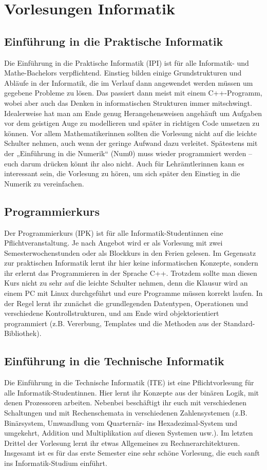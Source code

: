 \section{Vorlesungen Informatik}

\subsection{Einführung in die Praktische Informatik}
\label{info1}
Die Einführung in die Praktische Informatik (\gls{IPI}) ist für alle Informatik- und Mathe-Bachelors verpflichtend. Einstieg bilden einige Grundstrukturen und Abläufe in der Informatik, die im Verlauf dann angewendet werden müssen um gegebene Probleme zu lösen. Das passiert dann meist mit einem C++-Programm, wobei aber auch das Denken in informatischen Strukturen immer mitschwingt. Idealerweise hat man am Ende genug Herangehensweisen angehäuft um Aufgaben vor dem geistigen Auge zu modellieren und später in richtigen Code umsetzen zu können. Vor allem Mathematikerinnen sollten die Vorlesung nicht auf die leichte Schulter nehmen, auch wenn der geringe Aufwand dazu verleitet. Spätestens mit der „Einführung in die Numerik“ (\gls{Num0}) muss wieder programmiert werden -- euch darum drücken könnt ihr also nicht. Auch für Lehrämtlerinnen kann es interessant sein, die Vorlesung zu hören, um sich später den Einstieg in die Numerik zu vereinfachen.

\subsection{Programmierkurs}
\label{ipk}
Der Programmierkurs (\gls{IPK}) ist für alle Informatik-Studentinnen eine Pflichtveranstaltung. Je nach Angebot wird er als Vorlesung mit zwei Semesterwochenstunden oder als Blockkurs in den Ferien gelesen. Im Gegensatz zur praktischen Informatik lernt ihr hier keine informatischen Konzepte, sondern ihr erlernt das Programmieren in der Sprache C++. Trotzdem sollte man diesen Kurs nicht zu sehr auf die leichte Schulter nehmen, denn die Klausur wird an einem PC mit Linux durchgeführt und eure Programme müssen korrekt laufen. In der Regel lernt ihr zunächst die grundlegenden Datentypen, Operationen und verschiedene Kontrollstrukturen, und am Ende wird objektorientiert programmiert (z.B. Vererbung, Templates und die Methoden aus der Standard-Bibliothek).

\subsection{Einführung in die Technische Informatik}
\label{info2}
Die Einführung in die Technische Informatik (\gls{ITE}) ist eine Pflichtvorlesung für alle Informatik-Studentinnen. Hier lernt ihr Konzepte aus der binären Logik, mit denen Prozessoren arbeiten. Nebenbei beschäftigt ihr euch mit verschiedenen Schaltungen und mit Rechenschemata in verschiedenen Zahlensystemen (z.B. Binärsystem, Umwandlung vom Quarternär- ins Hexadezimal-System und umgekehrt, Addition und Multiplikation auf diesen Systemen usw.). Im letzten Drittel der Vorlesung lernt ihr etwas Allgemeines zu Rechnerarchitekturen. Insgesamt ist es für das erste Semester eine sehr schöne Vorlesung, die euch sanft ins Informatik-Studium einführt.


